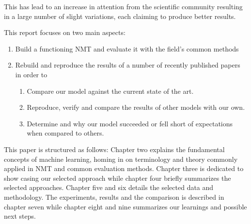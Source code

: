 \documentclass[10pt,a4paper,titlepage,twoside,english]{zhawreprt}
\begin{document}
This has lead to an increase in attention from the scientific community resulting in a large number of slight variations, each claiming to produce better results.

This report focuses on two main aspects:
\begin{enumerate}
	\item Build a functioning NMT and evaluate it with the field's common methods
	\item Rebuild and reproduce the results of a number of recently published papers in order to 
	\begin{enumerate}
		\item Compare our model against the current state of the art.
		\item Reproduce, verify and compare the results of other models with our own.
		\item Determine and why our model succeeded or fell short of expectations when compared to others.
	\end{enumerate}
\end{enumerate} 
This paper is structured as follows: Chapter two explains the fundamental concepts of machine learning, homing in on terminology and theory commonly applied in NMT and common evaluation methods. Chapter three is dedicated to show casing our selected approach while chapter four briefly summarizes the selected approaches. Chapter five and six details the selected data and methodology. The experiments, results and the comparison is described in chapter seven while chapter eight and nine summarizes our learnings and possible next steps.
\end{document}
